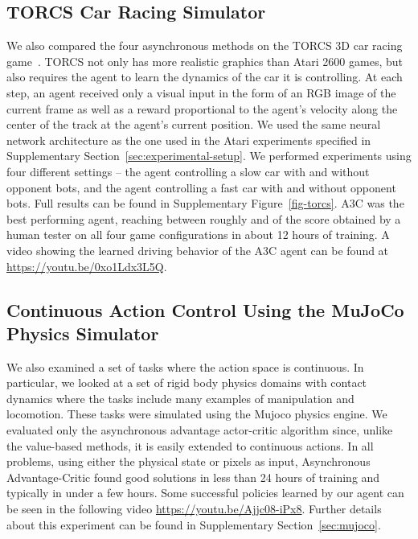 \documentclass{article} \usepackage{times}
\begin{document}
\subsection{TORCS Car Racing Simulator}





We also compared the four asynchronous methods on the TORCS 3D car racing game~\citep{wymann-torcs}.
TORCS not only has more realistic graphics than Atari 2600 games, but also requires the agent to learn the dynamics of the car it is controlling.
At each step, an agent received only a visual input in the form of an RGB image of the current frame as well as a reward proportional to the agent's velocity along the center of the track at the agent's current position.
We used the same neural network architecture as the one used in the Atari experiments specified in Supplementary Section~\ref{sec:experimental-setup}.
We performed experiments using four different settings -- the agent controlling a slow car with and without opponent bots, and the agent controlling a fast car with and without opponent bots.
Full results can be found in Supplementary Figure~\ref{fig-torcs}.
A3C was the best performing agent, reaching between roughly  and  of the score obtained by a human tester on all four game configurations in about 12 hours of training.
A video showing the learned driving behavior of the A3C agent can be found at \url{https://youtu.be/0xo1Ldx3L5Q}.




\subsection{Continuous Action Control Using the MuJoCo Physics Simulator}
We also examined a set of tasks where the action space is continuous.
In particular, we looked at a set of rigid body physics domains with contact dynamics
where the tasks include many examples of manipulation and locomotion.
These tasks were simulated using the Mujoco physics engine.
We evaluated only the asynchronous advantage actor-critic algorithm since, unlike the value-based methods, it is easily extended to continuous actions.
In all problems, using either the physical state or pixels as input, Asynchronous Advantage-Critic found good solutions in less than 24 hours of training and typically in under a few hours.
Some successful policies learned by our agent can be seen in the following video \url{https://youtu.be/Ajjc08-iPx8}.
Further details about this experiment can be found in Supplementary Section~\ref{sec:mujoco}.
\end{document}
